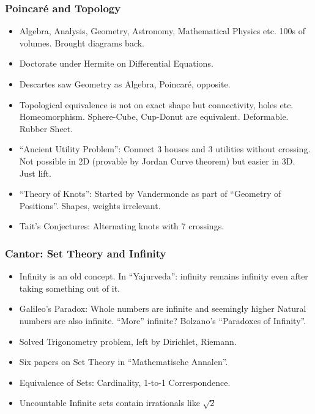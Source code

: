 \begin{frame}[fragile]
\frametitle{Poincar\'e and Topology}
\begin{itemize}[label=\textbullet,noitemsep,nolistsep]
\item Algebra, Analysis, Geometry, Astronomy, Mathematical Physics etc. 100s of volumes. Brought diagrams back.
\item Doctorate under Hermite on Differential Equations.
\item Descartes saw Geometry as Algebra, Poincar\'e, opposite.
\item Topological equivalence is not on exact shape but connectivity, holes etc. Homeomorphism. Sphere-Cube, Cup-Donut are equivalent. Deformable. Rubber Sheet.
\item ``Ancient Utility Problem'': Connect 3 houses and 3 utilities without crossing. Not possible in 2D (provable by Jordan Curve theorem) but easier in 3D. Just lift.
\item ``Theory of Knots'': Started by Vandermonde as part of ``Geometry of Positions''. Shapes, weights irrelevant.
\item Tait's Conjectures: Alternating knots with 7 crossings.
\end{itemize}
\end{frame}


\begin{frame}[fragile]
\frametitle{Cantor: Set Theory and Infinity}
\begin{itemize}[label=\textbullet,noitemsep,nolistsep]
\item Infinity is an old concept. In ``Yajurveda'': infinity remains infinity even after taking something out of it.
\item Galileo's Paradox: Whole numbers are infinite and seemingly higher Natural numbers are also infinite. ``More'' infinite? Bolzano's ``Paradoxes of Infinity''.
\item Solved Trigonometry problem, left by Dirichlet, Riemann.
\item Six papers on Set Theory in ``Mathematische  Annalen''.
\item Equivalence of Sets: Cardinality, 1-to-1 Correspondence.
\item Uncountable Infinite sets contain irrationals like $\sqrt 2$
\end{itemize}
\end{frame}

